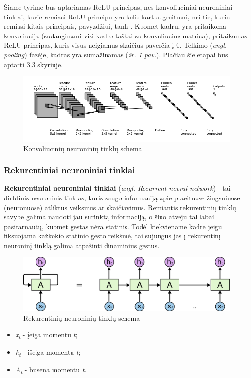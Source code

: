 \documentclass{VUMIFInfKursinis}
\begin{document}
Šiame tyrime bus aptariamas ReLU principas, nes konvoliuciniai neuroniniai tinklai, kurie remiasi ReLU principu yra kelis kartus greitesni, nei tie, kurie remiasi kitais principais, pavyzdžiui, tanh \cite{NIPS2012_4824}. Kuomet kadrui yra pritaikoma konvoliucija (sudauginami visi kadro taškai su konvoliucine matrica), pritaikomas ReLU principas, kuris visus neigiamus skaičius paverčia į 0. Telkimo (\textit{angl. pooling}) fazėje, kadras yra sumažinamas (\textit{žr. \ref{img:cnn} pav.}). Plačiau šie etapai bus aptarti 3.3 skyriuje.

\begin{figure}[H]
	\centering
	\includegraphics[width=.8\linewidth]{img/cnn}
	\caption[]{Konvoliucinių neuroninių tinklų schema\footnotemark}
	\label{img:cnn}
\end{figure}


\subsubsection{Rekurentiniai neuroniniai tinklai}
\textbf{Rekurentiniai neuroniniai tinklai} (\textit{angl. Recurrent neural network}) - tai dirbtinis neuroninis tinklas, kuris saugo informaciją apie praeituose žingsniuose (neuronuose) atliktus veiksmus ar skaičiavimus. Remiantis rekurentinių tinklų savybe galima naudoti jau surinktą informaciją, o šiuo atveju tai labai pasitarnautų, kuomet gestas nėra statinis. Todėl kiekviename kadre jeigu fiksuojama kažkokio statinio gesto reikšmė, tai sujungus jas į rekurentinį neuroninį tinklą galima atpažinti dinaminius gestus.


\begin{figure}[H]
	\centering
	\includegraphics[width=.8\linewidth]{img/rnn}
	\caption[]{Rekurentinių neuroninių tinklų schema\footnotemark}
	\label{img:rnn}
\end{figure}
\begin{itemize}
	\item \textit{x\textsubscript{t}} - įeiga momentu \textit{t};
	\item \textit{h\textsubscript{t}} - išeiga momentu \textit{t};
	\item \textit{A\textsubscript{t}} - būsena momentu \textit{t}.
\end{itemize}
\end{document}
